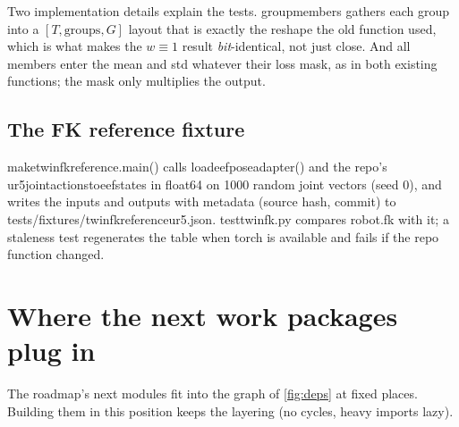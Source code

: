\documentclass[11pt,a4paper]{article}
\newcommand{\code}[1]{{\small\ttfamily\begingroup\def\_{\textunderscore\allowbreak}\def\/{/\allowbreak}#1\endgroup}}
\begin{document}
Two implementation details explain the tests. \code{group\_members} gathers each group into a $[T,\text{groups},G]$ layout that is exactly the reshape the old function used, which is what makes the $w\equiv1$ result \emph{bit}-identical, not just close. And all members enter the mean and std whatever their loss mask, as in both existing functions; the mask only multiplies the output.

\subsection{The FK reference fixture}
\code{make\_twin\_fk\_reference.main()} calls \code{load\_eef\_pose\_adapter()} and the repo's \code{ur5\_joint\_actions\_to\_eef\_states} in float64 on 1000 random joint vectors (seed 0), and writes the inputs and outputs with metadata (source hash, commit) to \code{tests/fixtures/twin\_fk\_reference\_ur5.json}. \code{test\_twin\_fk.py} compares \code{robot.fk} with it; a staleness test regenerates the table when torch is available and fails if the repo function changed.

\section{Where the next work packages plug in}\label{sec:next}
The roadmap's next modules fit into the graph of \cref{fig:deps} at fixed places. Building them in this position keeps the layering (no cycles, heavy imports lazy).
\end{document}
